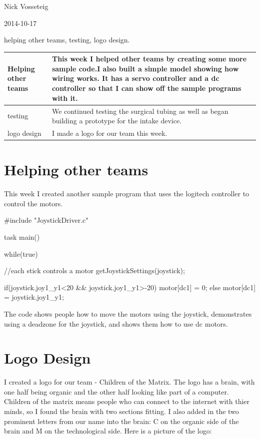 Nick Vosseteig

2014-10-17

helping other teams, testing, logo design.

\begin{tabular}{|p{5cm}|p{5cm}|}
 \hline
 Helping other teams&
This week I helped other teams by creating some more sample code.I also built a simple model showing how wiring works. It has a servo controller and a dc controller so that I can show off the sample programs with it. 
 \\
 \hline
testing&
We continued testing the surgical tubing as well as began building a prototype for the intake device.
 \\
 \hline
 logo design&
I made a logo for our team this week.
 \\
 \hline
\end{tabular}

\section*{Helping other teams}
This week I created another sample program that uses the logitech controller to control the motors. 
\begin{code}	
#include "JoystickDriver.c"

task main()
{

	while(true)
	{
		//each stick controls a motor
		getJoystickSettings(joystick);

		if(joystick.joy1_y1<20 && joystick.joy1_y1>-20){
			motor[dc1] = 0;
			}else{
			motor[dc1] = joystick.joy1_y1;
		}
	}
}
\end{code}
The code shows people how to move the motors using the joystick, demonstrates using a deadzone for the joystick, and shows them how to use dc motors.

\section*{Logo Design}
I created a logo for our team - Children of the Matrix. The logo has a brain, with one half being organic and the other half looking like part of a computer. Children of the matrix means people who can connect to the internet with thier minds, so I found the brain with two sections fitting. I also added in the two prominent letters from our name into the brain: C on the organic side of the brain and M on the technological side.
Here is a picture of the logo:


